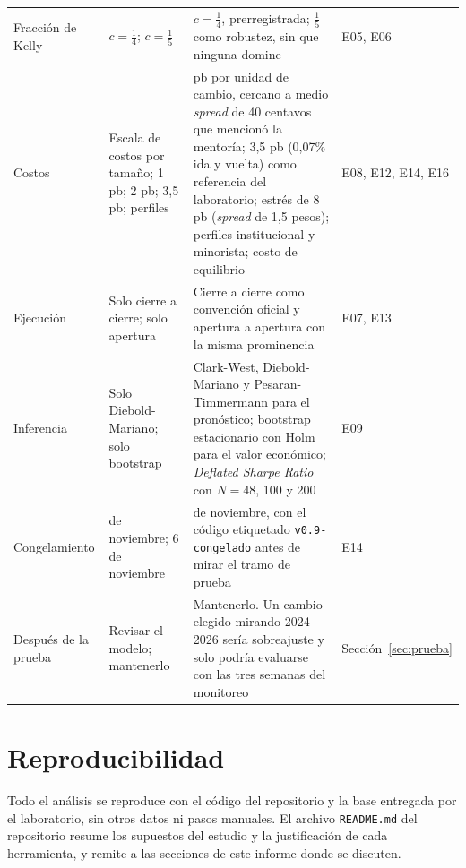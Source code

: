 \documentclass[11pt,a4paper]{article}
\begin{document}
\begin{table}[htbp]
\begin{tabularx}{\textwidth}{@{}>{\raggedright\arraybackslash}p{2.3cm} >{\raggedright\arraybackslash}X >{\raggedright\arraybackslash}X >{\raggedright\arraybackslash}p{2.4cm}@{}}
Fracción de Kelly & \(c=\tfrac14\); \(c=\tfrac15\) & \(c=\tfrac14\), prerregistrada; \(\tfrac15\) como robustez, sin que ninguna domine & E05, E06 \\
Costos & Escala de costos por tamaño; 1 pb; 2 pb; 3,5 pb; perfiles & 2 pb por unidad de cambio, cercano a medio \emph{spread} de 40 centavos que mencionó la mentoría; 3,5 pb (0,07\% ida y vuelta) como referencia del laboratorio; estrés de 8 pb (\emph{spread} de 1,5 pesos); perfiles institucional y minorista; costo de equilibrio & E08, E12, E14, E16 \\
Ejecución & Solo cierre a cierre; solo apertura & Cierre a cierre como convención oficial y apertura a apertura con la misma prominencia & E07, E13 \\
Inferencia & Solo Diebold-Mariano; solo bootstrap & Clark-West, Diebold-Mariano y Pesaran-Timmermann para el pronóstico; bootstrap estacionario con Holm para el valor económico; \emph{Deflated Sharpe Ratio} con \(N=48\), 100 y 200 & E09 \\
Congelamiento & 8 de noviembre; 6 de noviembre & 6 de noviembre, con el código etiquetado \texttt{v0.9-congelado} antes de mirar el tramo de prueba & E14 \\
Después de la prueba & Revisar el modelo; mantenerlo & Mantenerlo. Un cambio elegido mirando 2024--2026 sería sobreajuste y solo podría evaluarse con las tres semanas del monitoreo & Sección~\ref{sec:prueba} \\
\bottomrule
\end{tabularx}
\end{table}

\section{Reproducibilidad}\label{app:repro}

Todo el análisis se reproduce con el código del repositorio y la base entregada por el laboratorio, sin otros datos ni pasos manuales. El archivo \texttt{README.md} del repositorio resume los supuestos del estudio y la justificación de cada herramienta, y remite a las secciones de este informe donde se discuten.
\end{document}
